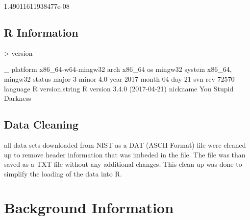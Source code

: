 \documentclass[10pt]{article}
\begin{document}
\begin{Schunk}
\begin{Soutput}
[1] 1.49011611938477e-08
\end{Soutput}
\end{Schunk}
\subsection{R Information}
\begin{Schunk}
\begin{Sinput}
> version
\end{Sinput}
\begin{Soutput}
               _                           
platform       x86_64-w64-mingw32          
arch           x86_64                      
os             mingw32                     
system         x86_64, mingw32             
status                                     
major          3                           
minor          4.0                         
year           2017                        
month          04                          
day            21                          
svn rev        72570                       
language       R                           
version.string R version 3.4.0 (2017-04-21)
nickname       You Stupid Darkness         
\end{Soutput}
\end{Schunk}
\subsection{Data Cleaning}
all data sets downloaded from NIST as a DAT (ASCII Format) file were cleaned up 
to remove header information that was imbeded in the file. The file was than saved
as a TXT file without any additional changes. This clean up was done to simplify 
the loading of the data into R.

\section{Background Information}
\end{document}

